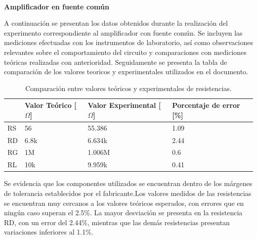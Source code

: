 \documentclass[journal]{IEEEtran}
\begin{document}
	\newline
	\\
	\textbf{Amplificador en fuente común}
	\par A continuación se presentan los datos obtenidos durante la realización del experimento correspondiente al amplificador con fuente común. Se incluyen las mediciones efectuadas con los instrumentos de laboratorio, así como observaciones relevantes sobre el comportamiento del circuito y comparaciones con mediciones teóricas realizadas con anterioridad. Seguidamente se presenta la tabla de comparación de los valores teoricos y experimentales utilizados en el documento.

	\begin{table}[h]
		\caption{Comparación entre valores teóricos y experimentales de resistencias.}
		\centering
		\renewcommand{\arraystretch}{1.2} %
		\begin{tabular}{|l|p{2cm}|p{2cm}|p{2cm}|}
			\hline
			& \textbf{Valor Teórico [$\Omega$]} &
			\textbf{Valor Experimental [$\Omega$]} & 
			\textbf{Porcentaje de error [\%]} \\
			\hline
			RS & 56  & 55.386  & 1.09 \\
			\hline
			RD & 6.8k   & 6.634k  & 2.44 \\
			\hline
			RG & 1M & 1.006M & 0.6 \\
			\hline
			RL & 10k & 9.959k & 0.41 \\
			\hline
		\end{tabular}
		\label{tab:resistencias2}
	\end{table}
	\par Se evidencia que los componentes utilizados se encuentran dentro de los márgenes de tolerancia establecidos por el fabricante.Los valores medidos de las resistencias se encuentran muy cercanos a los valores teóricos esperados, con errores que en ningún caso superan el 2.5\%. La mayor desviación se presenta en la resistencia RD, con un error del 2.44\%, mientras que las demás resistencias presentan variaciones inferiores al 1.1\%.
\end{document}
